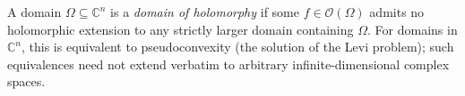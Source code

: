 
A domain $\Omega\subseteq\mathbb C^n$ is a \emph{domain of holomorphy} if some $f\in\mathcal O(\Omega)$ admits no holomorphic extension to any strictly larger domain containing $\Omega$. For domains in $\mathbb C^n$, this is equivalent to pseudoconvexity (the solution of the Levi problem); such equivalences need not extend verbatim to arbitrary infinite-dimensional complex spaces.
